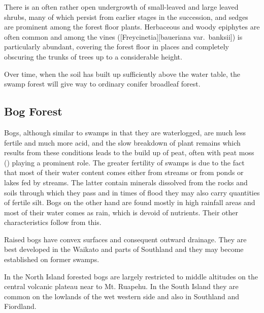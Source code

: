 There is an often rather open undergrowth of small-leaved and large leaved shrubs, many of which persist from earlier stages in the succession, and sedges are prominent among the forest floor plants.
Herbaceous and woody epiphytes are often common and among the vines  ([Freycinetia][baueriana var.\ banksii]) is particularly abundant, covering the forest floor in places and completely obscuring the trunks of trees up to a considerable height.

Over time, when the soil has built up sufficiently above the water table, the swamp forest will give way to ordinary conifer broadleaf forest.

\subsection{Bog Forest}

Bogs, although similar to swamps in that they are waterlogged, are much less fertile and much more acid, and the slow breakdown of plant remains which results from these conditions leads to the build up of peat, often with peat moss () playing a prominent role.
The greater fertility of swamps is due to the fact that most of their water content comes either from streams or from ponds or lakes fed by streams.
The latter contain minerals dissolved from the rocks and soils through which they pass and in times of flood they may also carry quantities of fertile silt.
Bogs on the other hand are found mostly in high rainfall areas and most of their water comes as rain, which is devoid of nutrients.
Their other characteristics follow from this.

Raised bogs have convex surfaces and consequent outward drainage.
They are best developed in the Waikato and parts of Southland and they may become established on former swamps.

In the North Island forested bogs are largely restricted to middle altitudes on the central volcanic plateau near to Mt. Ruapehu.
In the South Island they are common on the lowlands of the wet western side and also in Southland and Fiordland.

